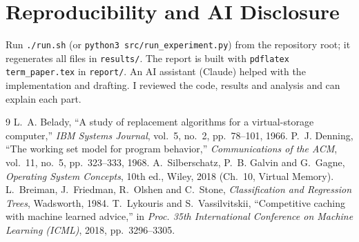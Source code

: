 \documentclass[10pt,a4paper]{article}
\begin{document}
\section*{Reproducibility and AI Disclosure}
Run \texttt{./run.sh} (or \texttt{python3 src/run\_experiment.py}) from the repository root; it regenerates all files in \texttt{results/}. The report is built with \texttt{pdflatex term\_paper.tex} in \texttt{report/}. An AI assistant (Claude) helped with the implementation and drafting. I reviewed the code, results and analysis and can explain each part.

\begin{thebibliography}{9}\small
{} L.~A. Belady, ``A study of replacement algorithms for a virtual-storage computer,'' \emph{IBM Systems Journal}, vol.~5, no.~2, pp.~78--101, 1966.
 P.~J. Denning, ``The working set model for program behavior,'' \emph{Communications of the ACM}, vol.~11, no.~5, pp.~323--333, 1968.
 A.~Silberschatz, P.~B. Galvin and G.~Gagne, \emph{Operating System Concepts}, 10th ed., Wiley, 2018 (Ch.~10, Virtual Memory).
 L.~Breiman, J.~Friedman, R.~Olshen and C.~Stone, \emph{Classification and Regression Trees}, Wadsworth, 1984.
 T.~Lykouris and S.~Vassilvitskii, ``Competitive caching with machine learned advice,'' in \emph{Proc. 35th International Conference on Machine Learning (ICML)}, 2018, pp.~3296--3305.
\end{thebibliography}
\end{document}

